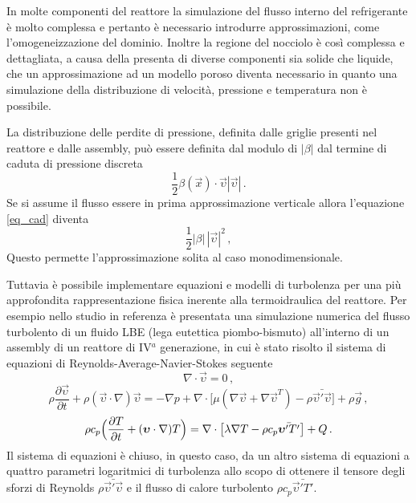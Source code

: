 In molte componenti del reattore la simulazione del flusso interno del 
refrigerante è molto complessa e pertanto è necessario introdurre 
approssimazioni, come l'omogeneizzazione del dominio.
Inoltre la regione del nocciolo è così complessa e dettagliata, a causa della 
presenta di diverse componenti sia solide che liquide, che un approssimazione 
ad 
un modello poroso diventa necessario in quanto una simulazione della 
distribuzione di velocità, pressione e temperatura non è possibile. 
\cite{cerroni}

La distribuzione delle perdite di pressione, definita dalle griglie presenti 
nel 
reattore e dalle assembly, può essere definita dal modulo di $|\beta|$ dal 
termine di caduta di pressione discreta
\begin{equation}
\label{eq_cad}
 \frac{1}{2} \beta(\vec{x}) \cdot \vec{\upsilon}|\vec{\upsilon}|\,.
\end{equation}
Se si assume il flusso essere in prima approssimazione verticale allora 
l'equazione \eqref{eq_cad} diventa
\begin{equation}
 \frac{1}{2} |\beta| \, |\vec{\upsilon}|^2 \,,
\end{equation}
Questo permette l'approssimazione solita al caso monodimensionale.

Tuttavia è possibile implementare equazioni e modelli di turbolenza per una più approfondita rappresentazione fisica inerente alla termoidraulica del reattore.
Per esempio nello studio in referenza \cite{leadmontecu} è presentata una 
simulazione numerica del flusso turbolento di un fluido LBE (lega eutettica 
piombo-bismuto) all'interno di un assembly di un reattore di IV$^{a}$ 
generazione, in cui è stato risolto il sistema di equazioni di 
Reynolds-Average-Navier-Stokes seguente
\begin{equation}
 \nabla \cdot \vec{\upsilon}=0 \,,
\end{equation}
\begin{equation}
 \rho \frac{\partial \vec{\upsilon}}{\partial t} + \rho (\vec{\upsilon} \cdot \nabla)\vec{\upsilon}= -\nabla p + \nabla \cdot \bigl[\mu (\nabla \vec{\upsilon} + \nabla \vec{\upsilon}^T)- \rho \bar{\vec{\upsilon}'\vec{\upsilon}} \bigr] + \rho \vec{g} \,,
\end{equation}
\begin{equation}
 \rho c_p \Bigl(\frac{\partial T}{\partial t} + (\vec{\upsilon} \cdot \nabla) T \Bigr) = \nabla \cdot \bigl[\lambda \nabla T - \rho c_p \bar{\vec{\upsilon}'T'}\bigr]+ Q \,.
\end{equation}
Il sistema di equazioni è chiuso, in questo caso, da un altro sistema di equazioni a quattro parametri logaritmici di turbolenza allo scopo di ottenere il tensore degli sforzi di Reynolds $\rho \bar{\vec{\upsilon}'\vec{\upsilon}}$ e il flusso di calore turbolento $\rho c_p \bar{\vec{\upsilon}'T'}$.


